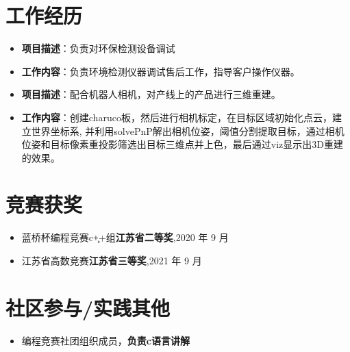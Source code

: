\documentclass{resume}
\begin{document}
\section{工作经历}
\begin{itemize}
\item \textbf{项目描述}：负责对环保检测设备调试
\item\textbf{工作内容}：负责环境检测仪器调试售后工作，指导客户操作仪器。
\end{itemize}
\begin{itemize}
\item \textbf{项目描述}：配合机器人相机，对产线上的产品进行三维重建。
\item\textbf{工作内容}：创建charuco板，然后进行相机标定，在目标区域初始化点云，建立世界坐标系, 并利用solvePnP解出相机位姿，阈值分割提取目标，通过相机位姿和目标像素重投影筛选出目标三维点并上色，最后通过viz显示出3D重建的效果。
\end{itemize}

\section{竞赛获奖}
\begin{itemize}[parsep=0.2ex]
\item 蓝桥杯编程竞赛c\c++组\textbf{江苏省二等奖},2020 年 9 月
\item 江苏省高数竞赛\textbf{江苏省三等奖},2021 年 9 月
\end{itemize}

\section{社区参与/实践其他}
\begin{itemize}[parsep=0.2ex]
\item 编程竞赛社团组织成员，\textbf{负责c语言讲解 }

\end{itemize}
\end{document}
